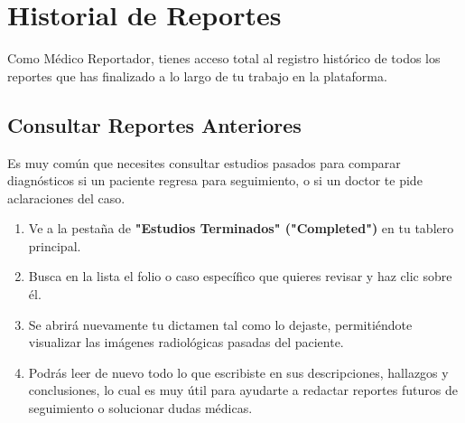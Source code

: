\section{Historial de Reportes}

Como Médico Reportador, tienes acceso total al registro histórico de todos los reportes que has finalizado a lo largo de tu trabajo en la plataforma.

\subsection{Consultar Reportes Anteriores}

Es muy común que necesites consultar estudios pasados para comparar diagnósticos si un paciente regresa para seguimiento, o si un doctor te pide aclaraciones del caso.

\begin{enumerate}
    \item Ve a la pestaña de \textbf{"Estudios Terminados" ("Completed")} en tu tablero principal.
    \item Busca en la lista el folio o caso específico que quieres revisar y haz clic sobre él.
    \item Se abrirá nuevamente tu dictamen tal como lo dejaste, permitiéndote visualizar las imágenes radiológicas pasadas del paciente.
    \item Podrás leer de nuevo todo lo que escribiste en sus descripciones, hallazgos y conclusiones, lo cual es muy útil para ayudarte a redactar reportes futuros de seguimiento o solucionar dudas médicas.
\end{enumerate}
